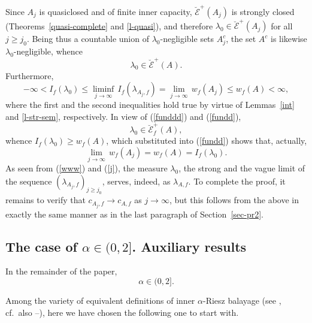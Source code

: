 \documentclass[12pt,a4paper,reqno]{amsart} %
\theoremstyle{lause}
\theoremstyle{maaritelma}
\theoremstyle{lause}
\theoremstyle{maaritelma}
\numberwithin{equation}{section}
\begin{document}
Since $A_j$ is quasiclosed and of finite inner capacity, $\breve{\mathcal E}^+(A_j)$ is strongly closed (Theorems~\ref{quasi-complete} and \ref{l-quasi}), and therefore $\lambda_0\in\breve{\mathcal E}^+(A_j)$ for all $j\geqslant j_0$. Being thus a countable union of $\lambda_0$-neg\-lig\-ible sets $A_j^c$, the set $A^c$ is likewise $\lambda_0$-neg\-lig\-ible, whence
\begin{equation}\label{funddd}\lambda_0\in\breve{\mathcal E}^+(A).\end{equation}
Furthermore,
\begin{equation}\label{fundd}
-\infty<I_f(\lambda_0)\leqslant\liminf_{j\to\infty}\,I_f(\lambda_{A_j,f})=\lim_{j\to\infty}\,w_f(A_j)\leqslant w_f(A)<\infty,
\end{equation}
where the first and the second inequalities hold true by virtue of Lemmas~\ref{int} and \ref{l-str-sem}, respectively. In view of (\ref{funddd}) and (\ref{fundd}),
\begin{equation}\label{www}
 \lambda_0\in\breve{\mathcal E}_f^+(A),
\end{equation}
whence $I_f(\lambda_0)\geqslant w_f(A)$, which substituted into (\ref{fundd}) shows that, actually,
\begin{equation}\label{j}
 \lim_{j\to\infty}\,w_f(A_j)=w_f(A)=I_f(\lambda_0).
\end{equation}
As seen from (\ref{www}) and (\ref{j}), the measure $\lambda_0$, the strong and the vague limit of the sequence $(\lambda_{A_j,f})_{j\geqslant j_0}$, serves, indeed, as $\lambda_{A,f}$. To complete the proof, it remains to verify that $c_{A_j,f}\to c_{A,f}$ as $j\to\infty$, but this follows from the above in exactly the same manner as in the last paragraph of Section~\ref{sec-pr2}.

\subsection{The case of $\alpha\in(0,2]$. Auxiliary results}\label{sec-lemmas2} In the remainder of the paper,
\[\alpha\in(0,2].\]

Among the variety of equivalent definitions of inner $\alpha$-Riesz balayage
(see \cite{Z-bal,Z-bal2}, cf.\ also \cite{Z-arx1}--\cite{Z-arx}), here we have chosen the following one to start with.
\end{document}
